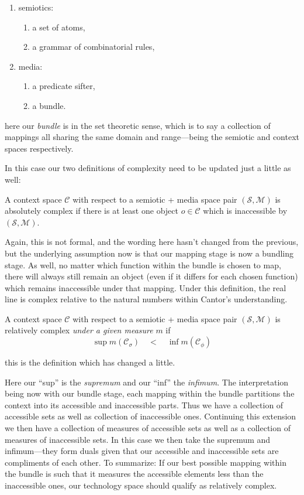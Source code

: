 \documentclass[twoside]{article}
\newenvironment{definition}[1][Definition]{\begin{trivlist}
\item[\hskip \labelsep {\bfseries #1:}]}{\end{trivlist}}
\begin{document}
\begin{enumerate}
\item semiotics:
\begin{enumerate}
\item a set of atoms,
\item a grammar of combinatorial rules,
\end{enumerate}
\item media:
\begin{enumerate}
\item a predicate sifter,
\item a bundle.
\end{enumerate}
\end{enumerate}
here our \emph{bundle} is in the set theoretic sense, which is to say a collection of mappings all sharing the same domain
and range---being the semiotic and context spaces respectively.

In this case our two definitions of complexity need to be updated just a little as well:

\begin{definition}[Absolute Complexity (v1.0)]
A context space $ \mathcal{C} $ with respect to a semiotic + media space pair $ (\mathcal{S}, \mathcal{M}) $
is absolutely complex if there is at least one object $ o\in\mathcal{C} $ which is inaccessible by $ (\mathcal{S}, \mathcal{M}) $.
\end{definition}
Again, this is not formal, and the wording here hasn't changed from the previous, but the underlying assumption now is that
our mapping stage is now a bundling stage. As well, no matter which function within the bundle is chosen to map, there will
always still remain an object (even if it differs for each chosen function) which remains inaccessible under that mapping.
Under this definition, the real line is complex relative to the natural numbers within Cantor's understanding.

\begin{definition}[Relative Complexity (v1.0)]
A context space $ \mathcal{C} $ with respect to a semiotic + media space pair $ (\mathcal{S}, \mathcal{M}) $
is relatively complex \emph{under a given measure} $ m $ if
$$ \sup m(\mathcal{C}_\sigma)\quad <\quad \inf m(\mathcal{C}_\phi) $$
\end{definition}
this is the definition which has changed a little.

Here our ``sup'' is the \emph{supremum} and our ``inf'' the \emph{infimum}. The interpretation being now with our bundle stage,
each mapping within the bundle partitions the context into its accessible and inaccessible parts. Thus we have
a collection of accessible sets as well as collection of inaccessible ones. Continuing this extension we then have a collection
of measures of accessible sets as well as a collection of measures of inaccessible sets. In this case we then take the supremum
and infimum---they form duals given that our accessible and inaccessible sets are compliments of each other. To summarize:
If our best possible mapping within the bundle is such that it measures the accessible elements less than the inaccessible ones,
our technology space should qualify as relatively complex.
\end{document}
